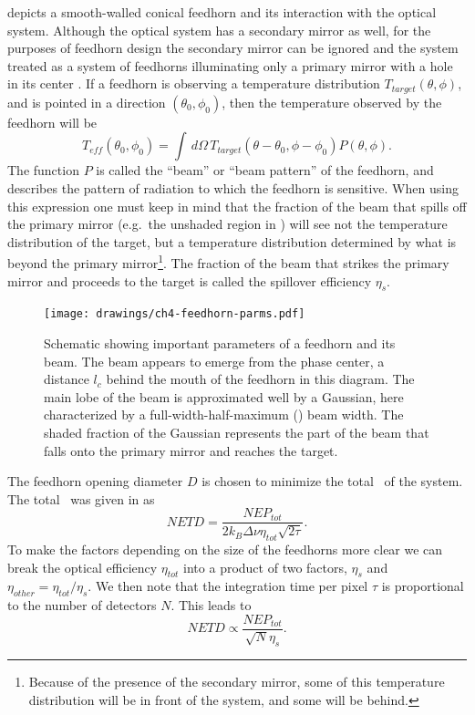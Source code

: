  depicts a smooth-walled conical feedhorn and its interaction with the optical system.
Although the optical system has a secondary mirror as well, for the purposes of feedhorn design the secondary mirror can be ignored and the system treated as a system of feedhorns illuminating only a primary mirror with a hole in its center \cite{goldsmith_quasioptical_1998}.
If a feedhorn is observing a temperature distribution $T_{target}(\theta,\phi)$, and is pointed in a direction $(\theta_0, \phi_0)$, then the temperature observed by the feedhorn will be
\begin{equation}
    T_{eff}(\theta_0,\phi_0) = \int \, d \Omega \, T_{target}(\theta - \theta_0,\phi - \phi_0) P(\theta,\phi).
\end{equation}
The function $P$ is called the ``beam'' or ``beam pattern'' of the feedhorn, and describes the pattern of radiation to which the feedhorn is sensitive.
When using this expression one must keep in mind that the fraction of the beam that spills off the primary mirror (e.g.\ the unshaded region in ) will see not the temperature distribution of the target, but a temperature distribution determined by what is beyond the primary mirror\footnote{Because of the presence of the secondary mirror, some of this temperature distribution will be in front of the system, and some will be behind.}.
The fraction of the beam that strikes the primary mirror and proceeds to the target is called the spillover efficiency $\eta_s$.

\begin{figure}
\centering
\texttt{[image: drawings/ch4-feedhorn-parms.pdf]}
\caption[Schematic showing important parameters of a feedhorn and its beam]{
  Schematic showing important parameters of a feedhorn and its beam. The beam appears to emerge from the phase center, a distance $l_c$ behind the mouth of the feedhorn in this diagram. The main lobe of the beam is approximated well by a Gaussian, here characterized by a full-width-half-maximum (\FWHM) beam width. The shaded fraction of the Gaussian represents the part of the beam that falls onto the primary mirror and reaches the target.}
\label{fig:feedhorn-parms}
\end{figure}

The feedhorn opening diameter $D$ is chosen to minimize the total \NETD\ of the system.
The total \NETD\ was given in  as
\begin{equation}
    NETD = \frac{NEP_{tot}}{2 k_B \Delta \nu \eta_{tot} \sqrt{2 \tau}}.
\end{equation}
To make the factors depending on the size of the feedhorns more clear we can break the optical efficiency $\eta_{tot}$ into a product of two factors, $\eta_s$ and $\eta_{other} = \eta_{tot} / \eta_s$.
We then note that the integration time per pixel $\tau$ is proportional to the number of detectors $N$.
This leads to
\begin{equation}
    NETD \propto \frac{NEP_{tot}}{\sqrt{N}\eta_s}.
\end{equation}


